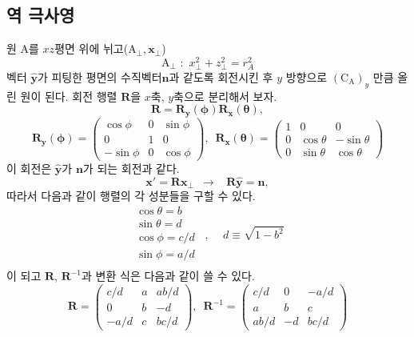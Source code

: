 \documentclass[chapter,a4paper,10pt]{oblivoir}
\begin{document}
\subsection{역 극사영}
원 A를 $xz$평면 위에 뉘고($\textrm{A}_\perp,\mathbf{x}_\perp$)
\begin{equation}
\textrm{A}_\perp \,\,:\,\, x_\perp^2 + z_\perp^2 = r_A^2
\end{equation}
벡터 $\hat{\mathbf{y}}$가 피팅한 평면의 수직벡터$\mathbf{n}$과 같도록 회전시킨 후
$y$ 방향으로 $(\textrm{C}_\textrm{A})_y$ 만큼 올린 원이 된다.
회전 행렬 $\mathbf{R}$을 $x$축, $y$축으로 분리해서 보자.
\begin{equation}
\mathbf{R} = \mathbf{R_y(\phi)}\mathbf{R_x(\theta)},
\end{equation}
\begin{equation}
\mathbf{R_y(\phi)} = \left( \begin{array}{ccc}
  \cos \phi & 0 & \sin \phi \\
  0 & 1 & 0 \\
  -\sin \phi & 0 & \cos \phi
\end{array} \right) ,\,\,\,
\mathbf{R_x(\theta)} = \left( \begin{array}{ccc}
  1 & 0 & 0 \\
  0 & \cos \theta & -\sin \theta \\
  0 & \sin \theta & \cos \theta
\end{array} \right)
\end{equation}
이 회전은 $\hat{\mathbf{y}}$가 $\mathbf{n}$가 되는 회전과 같다.
\begin{equation}
\mathbf x' = \mathbf R\mathbf x_\perp
\,\,\,\longrightarrow\,\,\,\,\,
\mathbf{R} \hat{\mathbf{y}} = \mathbf{n},
\end{equation}
따라서 다음과 같이 행렬의 각 성분들을 구할 수 있다.
\begin{equation}
\left. \begin{array}{ll}
\cos \theta = b \\
\sin \theta = d \\
\cos \phi = c/d \\
\sin \phi = a/d \\
\end{array}\right.
\,\,\,,\,\,\,\,\,\,\,d \equiv \sqrt{1-b^2}
\end{equation}
이 되고 $\mathbf{R}$, $\mathbf{R}^{-1}$과 변환 식은 다음과 같이 쓸 수 있다.
\begin{equation}
\mathbf{R} = \left( \begin{array}{ccc}
  c/d & a & ab/d \\
  0 & b & -d \\
  -a/d & c & bc/d
\end{array} \right)
,\,\,\,\mathbf{R}^{-1} = \left( \begin{array}{ccc}
  c/d & 0 & -a/d \\
  a & b & c \\
  ab/d & -d & bc/d
\end{array} \right)
\end{equation}
\end{document}
